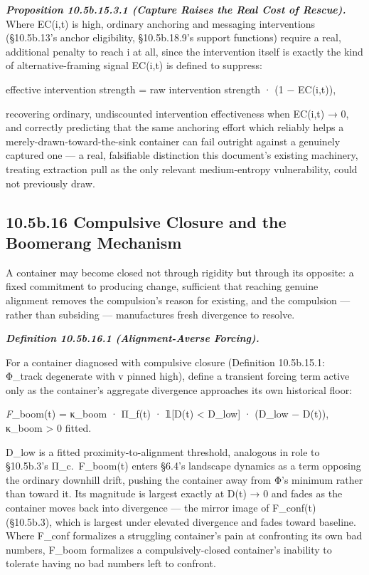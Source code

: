 \documentclass[
]{article}
\begin{document}
\emph{\textbf{Proposition 10.5b.15.3.1 (Capture Raises the Real Cost of
Rescue).}} Where EC(i,t) is high, ordinary anchoring and messaging
interventions (§10.5b.13's anchor eligibility, §10.5b.18.9's support
functions) require a real, additional penalty to reach i at all, since
the intervention itself is exactly the kind of alternative-framing
signal EC(i,t) is defined to suppress:

effective intervention strength = raw intervention strength · (1 −
EC(i,t)),

recovering ordinary, undiscounted intervention effectiveness when
EC(i,t) → 0, and correctly predicting that the same anchoring effort
which reliably helps a merely-drawn-toward-the-sink container can fail
outright against a genuinely captured one --- a real, falsifiable
distinction this document's existing machinery, treating extraction pull
as the only relevant medium-entropy vulnerability, could not previously
draw.

\hypertarget{b.16-compulsive-closure-and-the-boomerang-mechanism}{%
\subsection{10.5b.16 Compulsive Closure and the Boomerang
Mechanism}\label{b.16-compulsive-closure-and-the-boomerang-mechanism}}

A container may become closed not through rigidity but through its
opposite: a fixed commitment to producing change, sufficient that
reaching genuine alignment removes the compulsion's reason for existing,
and the compulsion --- rather than subsiding --- manufactures fresh
divergence to resolve.

\emph{\textbf{Definition 10.5b.16.1 (Alignment-Averse Forcing).}}

For a container diagnosed with compulsive closure (Definition
10.5b.15.1: Φ\_track degenerate with v pinned high), define a transient
forcing term active only as the container's aggregate divergence
approaches its own historical floor:

\emph{F}\_boom(t) = κ\_boom · Π\_f(t) · 𝟙{[}D(t) \textless{} D\_low{]} ·
(D\_low − D(t)), κ\_boom \textgreater{} 0 fitted.

D\_low is a fitted proximity-to-alignment threshold, analogous in role
to §10.5b.3's Π\_c.~F\_boom(t) enters §6.4's landscape dynamics as a
term opposing the ordinary downhill drift, pushing the container away
from Φ's minimum rather than toward it. Its magnitude is largest exactly
at D(t) → 0 and fades as the container moves back into divergence ---
the mirror image of F\_conf(t) (§10.5b.3), which is largest under
elevated divergence and fades toward baseline. Where F\_conf formalizes
a struggling container's pain at confronting its own bad numbers,
F\_boom formalizes a compulsively-closed container's inability to
tolerate having no bad numbers left to confront.
\end{document}
